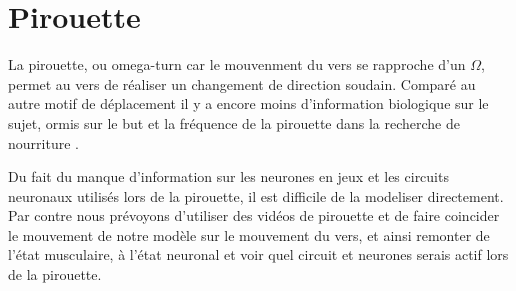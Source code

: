 
\section{Pirouette} %
\label{sec:Pirouette}

La pirouette, ou omega-turn car le mouvenment du vers se rapproche d'un $\Omega$, permet au vers
de réaliser un changement de direction soudain. Comparé au autre motif de déplacement il y a encore
moins d'information biologique sur le sujet, ormis sur le but et la fréquence de la pirouette dans
la recherche de nourriture \cite{Gray2005}.

Du fait du manque d'information sur les neurones en jeux et les circuits neuronaux utilisés lors de
la pirouette, il est difficile de la modeliser directement. Par contre nous prévoyons d'utiliser des
vidéos de pirouette et de faire coincider le mouvement de notre modèle sur le mouvement du vers, et
ainsi remonter de l'état musculaire, à l'état neuronal et voir quel circuit et neurones serais actif
lors de la pirouette.


